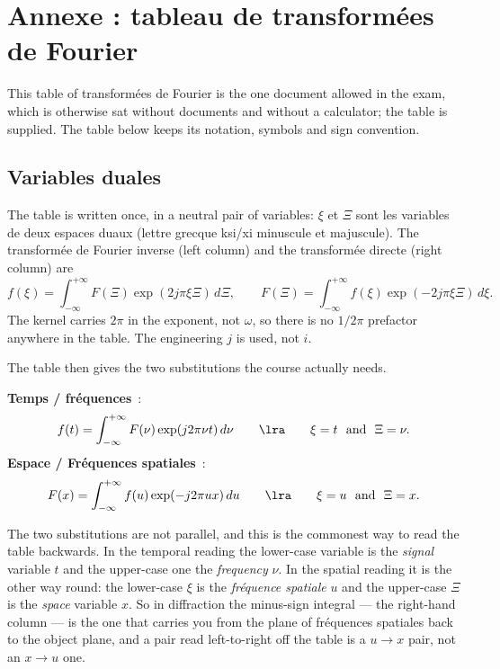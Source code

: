 \section{Annexe : tableau de transformées de Fourier}

This table of transformées de Fourier is the one document allowed in the exam, which
is otherwise sat without documents and without a calculator; the table is
supplied. The table below keeps its notation, symbols and sign convention.

\subsection{Variables duales}

\begin{notation}
  The table is written once, in a neutral pair of variables: $\xi$ et $\Xi$
  sont les variables de deux espaces duaux (lettre grecque ksi/xi minuscule et
  majuscule). The transformée de Fourier inverse (left column) and the
  transformée directe (right column) are
  \[
    f(\xi)=\int_{-\infty}^{+\infty}F(\Xi)\exp(2j\pi\xi\Xi)\,d\Xi,
    \qquad
    F(\Xi)=\int_{-\infty}^{+\infty}f(\xi)\exp(-2j\pi\xi\Xi)\,d\xi .
  \]
  The kernel carries $2\pi$ in the exponent, not $\omega$, so there is no
  $1/2\pi$ prefactor anywhere in the table. The engineering $j$ is used, not $i$.
\end{notation}

The table then gives the two substitutions the course actually needs.

\begin{notation}
  \textbf{Temps / fréquences}~:
  \[
    f(t)=\int_{-\infty}^{+\infty}F(\nu)\exp(j2\pi\nu t)\,d\nu
    \qquad\lra\qquad \xi=t \ \text{ and }\ \Xi=\nu .
  \]
  \textbf{Espace / Fréquences spatiales}~:
  \[
    F(x)=\int_{-\infty}^{+\infty}f(u)\exp(-j2\pi ux)\,du
    \qquad\lra\qquad \xi=u \ \text{ and }\ \Xi=x .
  \]
\end{notation}

\begin{remark}
  The two substitutions are not parallel, and this is the commonest way to read
  the table backwards. In the temporal reading the lower-case variable is the
  \emph{signal} variable $t$ and the upper-case one the \emph{frequency} $\nu$.
  In the spatial reading it is the other way round: the lower-case $\xi$ is the
  \emph{fréquence spatiale} $u$ and the upper-case $\Xi$ is the \emph{space}
  variable $x$. So in diffraction the minus-sign integral --- the right-hand
  column --- is the one that carries you from the plane of fréquences spatiales
  back to the object plane, and a pair read left-to-right off the table is a
  $u\to x$ pair, not an $x\to u$ one.
\end{remark}

